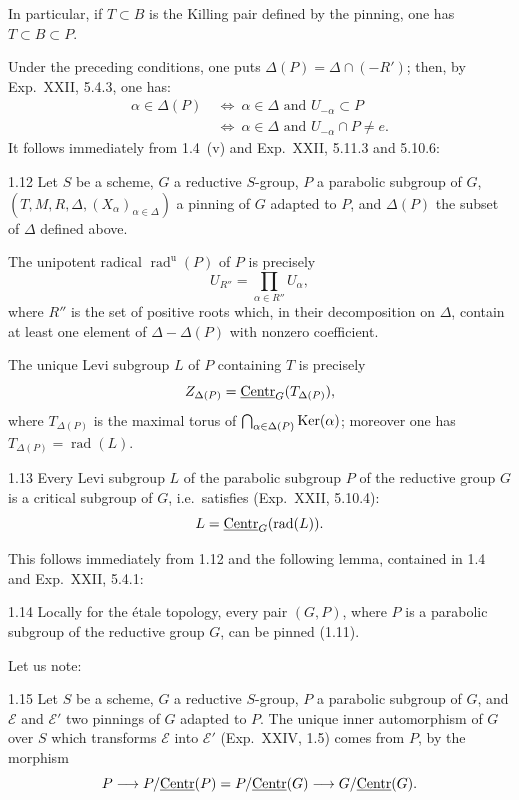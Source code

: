 In particular, if $T\subset B$ is the Killing pair defined by the pinning, one has $T\subset B\subset P$.

Under the preceding conditions, one puts $\Delta(P)=\Delta\cap(-R')$; then, by Exp.~XXII, 5.4.3, one has:
\[
\begin{aligned}
\alpha\in\Delta(P)&\ \Longleftrightarrow\ \alpha\in\Delta\text{ and }U_{-\alpha}\subset P\\
&\ \Longleftrightarrow\ \alpha\in\Delta\text{ and }U_{-\alpha}\cap P\ne e.
\end{aligned}
\]
It follows immediately from 1.4~(v) and Exp.~XXII, 5.11.3 and 5.10.6:
\begin{proposition}{1.12}\label{XXVI.1.12}
Let $S$ be a scheme, $G$ a reductive $S$-group, $P$ a parabolic subgroup of $G$, $(T,M,R,\Delta,(X_\alpha)_{\alpha\in\Delta})$ a pinning of $G$ adapted to $P$, and $\Delta(P)$ the subset of $\Delta$ defined above.
\begin{enumeratei}
\item The unipotent radical $\operatorname{rad}^{\mathrm u}(P)$ of $P$ is precisely
\[
U_{R''}=\prod_{\alpha\in R''}U_\alpha,
\]
where $R''$ is the set of positive roots which, in their decomposition on $\Delta$, contain at least one element of $\Delta-\Delta(P)$ with nonzero coefficient.
\item The unique Levi subgroup $L$ of $P$ containing $T$ is precisely
\[
Z_{\Delta(P)}=\underline{\mathrm{Centr}}_G(T_{\Delta(P)}),
\]
where $T_{\Delta(P)}$ is the maximal torus of $\bigcap_{\alpha\in\Delta(P)}\operatorname{Ker}(\alpha)$; moreover one has $T_{\Delta(P)}=\operatorname{rad}(L)$.
\end{enumeratei}
\end{proposition}
\begin{corollary}{1.13}\label{XXVI.1.13}
Every Levi subgroup $L$ of the parabolic subgroup $P$ of the reductive group $G$ is a critical subgroup of $G$, i.e.~satisfies (Exp.~XXII, 5.10.4):
\[
L=\underline{\mathrm{Centr}}_G(\operatorname{rad}(L)).
\]
\end{corollary}
This follows immediately from 1.12 and the following lemma, contained in 1.4 and Exp.~XXII, 5.4.1:
\begin{lemma}{1.14}\label{XXVI.1.14}
Locally for the \'etale topology, every pair $(G,P)$, where $P$ is a parabolic subgroup of the reductive group $G$, can be pinned (1.11).
\end{lemma}
Let us note:
\begin{proposition}{1.15}\label{XXVI.1.15}
Let $S$ be a scheme, $G$ a reductive $S$-group, $P$ a parabolic subgroup of $G$, and $\mathcal E$ and $\mathcal E'$ two pinnings of $G$ adapted to $P$. The unique inner automorphism of $G$ over $S$ which transforms $\mathcal E$ into $\mathcal E'$ (Exp.~XXIV, 1.5) comes from $P$, by the morphism
\[
P\longrightarrow P/\underline{\mathrm{Centr}}(P)=P/\underline{\mathrm{Centr}}(G)\longrightarrow G/\underline{\mathrm{Centr}}(G).
\]
\end{proposition}
